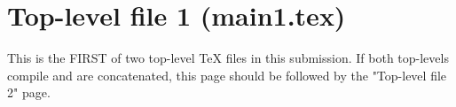 \documentclass{article}
\begin{document}
\section*{Top-level file 1 (main1.tex)}
This is the FIRST of two top-level TeX files in this submission.
If both top-levels compile and are concatenated, this page should be
followed by the "Top-level file 2" page.
\end{document}
